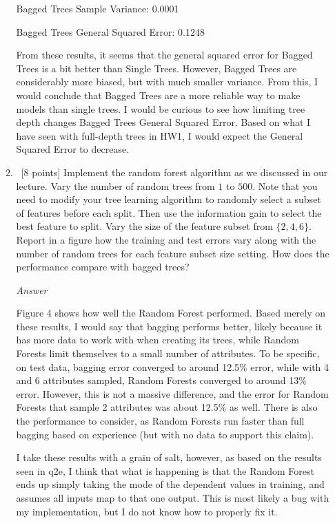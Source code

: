 \documentclass[12pt, fullpage,letterpaper]{article}
\begin{document}
\begin{enumerate}
\begin{enumerate}
    Bagged Trees Sample Variance: 0.0001
    
    Bagged Trees General Squared Error: 0.1248
    
    From these results, it seems that the general squared error for Bagged Trees is a bit better than Single Trees. However, Bagged Trees are considerably more biased, but with much smaller variance. From this, I would conclude that Bagged Trees are a more reliable way to make models than single trees. I would be curious to see how limiting tree depth changes Bagged Trees General Squared Error. Based on what I have seen with full-depth trees in HW1, I would expect the General Squared Error to decrease.
	 
	\item~[8 points] Implement the random forest algorithm as we discussed in our lecture. Vary the number of random trees from $1$ to $500$. Note that you need to modify your tree learning algorithm to randomly select a subset of features before each split. Then use the information gain to select the best feature to split.  Vary the size of the feature subset from $\{2, 4, 6\}$.  Report in a figure how the training and test errors vary along with the number of random trees for each feature subset size setting. How does the performance compare with bagged trees? 
	
	\emph{Answer}
	
	Figure 4 shows how well the Random Forest performed. Based merely on these results, I would say that bagging performs better, likely because it has more data to work with when creating its trees, while Random Forests limit themselves to a small number of attributes. To be specific, on test data, bagging error converged to around 12.5\% error, while with 4 and 6 attributes sampled, Random Forests converged to around 13\% error. However, this is not a massive difference, and the error for Random Forests that sample 2 attributes was about 12.5\% as well. There is also the performance to consider, as Random Forests run faster than full bagging based on experience (but with no data to support this claim). 
	
	I take these results with a grain of salt, however, as based on the results seen in q2e, I think that what is happening is that the Random Forest ends up simply taking the mode of the dependent values in training, and assumes all inputs map to that one output. This is most likely a bug with my implementation, but I do not know how to properly fix it.
	

\end{enumerate}
\end{enumerate}
\end{document}
